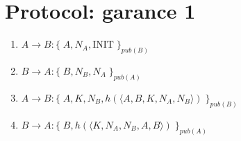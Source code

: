 \section{Protocol: garance 1}

\begin{enumerate}
    \item $A \rightarrow B : \{\;A, N_A, \text{INIT}\;\}_{pub(B)}$
    \item $B \rightarrow A : \{\;B, N_B, N_A\;\}_{pub(A)}$
    \item $A \rightarrow B : \{\;A, K, N_B, h(\langle A, B, K, N_A, N_B\rangle)\;\}_{pub(B)}$
    \item $B \rightarrow A : \{\;B, h(\langle K, N_A, N_B, A, B\rangle)\;\}_{pub(A)}$
\end{enumerate}
